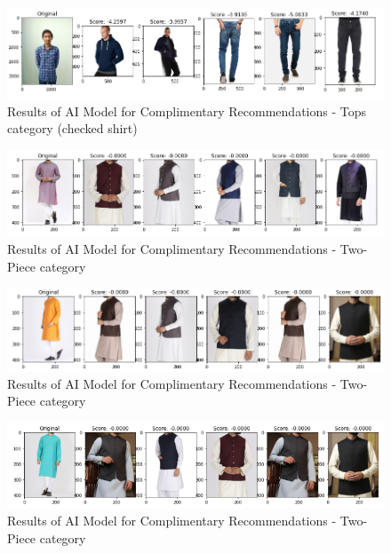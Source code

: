 \begin{figure}[H]
\includegraphics[width=12cm]{images/comp4.PNG} 
\centering
\caption{Results of AI Model for Complimentary Recommendations - Tops category (checked shirt)}
\label{architecture}
\end{figure}

\begin{figure}[H]
\includegraphics[width=12cm]{images/comp5.PNG} 
\centering
\caption{Results of AI Model for Complimentary Recommendations - Two-Piece category}
\label{architecture}
\end{figure}

\begin{figure}[H]
\includegraphics[width=12cm]{images/comp6.PNG} 
\centering
\caption{Results of AI Model for Complimentary Recommendations - Two-Piece category}
\label{architecture}
\end{figure}

\begin{figure}[H]
\includegraphics[width=12cm]{images/comp7.PNG} 
\centering
\caption{Results of AI Model for Complimentary Recommendations - Two-Piece category}
\label{architecture}
\end{figure}